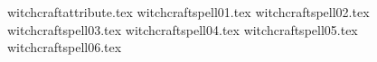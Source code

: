 

\tablelabels
{witchcraftattribute.tex}%
\spellrule
{witchcraftspell01.tex}%
\spellrule
{witchcraftspell02.tex}%
\spellrule
{witchcraftspell03.tex}%
\spellrule
{witchcraftspell04.tex}%
\spellrule
{witchcraftspell05.tex}%
\spellrule
{witchcraftspell06.tex}%
\closetable{}
